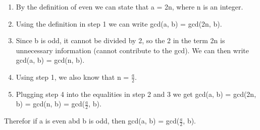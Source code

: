 \documentclass[]{article}
\providecommand{\tightlist}{%
  \setlength{\itemsep}{0pt}\setlength{\parskip}{0pt}}
\begin{document}
\begin{enumerate}
\def\labelenumi{\arabic{enumi}.}
\tightlist
\item
  By the definition of even we can state that a = 2n, where n is an
  integer.
\item
  Using the definition in step 1 we can write gcd(a, b) = gcd(2n, b).
\item
  Since b is odd, it cannot be divided by 2, so the 2 in the term 2n is
  unnecessary information (cannot contribute to the gcd). We can then
  write gcd(a, b) = gcd(n, b).
\item
  Using step 1, we also know that n = \(\frac{a}{2}\).
\item
  Plugging step 4 into the equalities in step 2 and 3 we get gcd(a, b) =
  gcd(2n, b) = gcd(n, b) = gcd(\(\frac{a}{2}\), b).
\end{enumerate}

Therefor if a is even abd b is odd, then gcd(a, b) =
gcd(\(\frac{a}{2}\), b).
\end{document}
